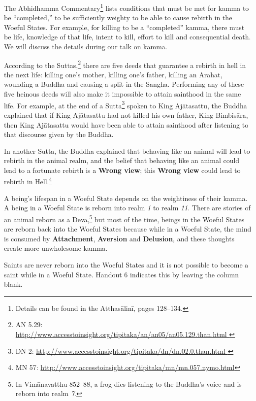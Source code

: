 The Abhidhamma Commentary\footnote{Details can be found in the Atthasālinī, pages 128--134.} lists conditions that must be met for kamma to be “completed,” to be sufficiently weighty to be able to cause rebirth in the Woeful States. For example, for killing to be a “completed” kamma, there must be life, knowledge of that life, intent to kill, effort to kill and consequential death. We will discuss the details during our talk on kamma.

According to the Suttas,\footnote{AN 5.29: \url{http://www.accesstoinsight.org/tipitaka/an/an05/an05.129.than.html }} there are five deeds that guarantee a rebirth in hell in the next life: killing one’s mother, killing one’s father, killing an Arahat, wounding a Buddha and causing a split in the Sangha. Performing any of these five heinous deeds will also make it impossible to attain sainthood in the same life. For example, at the end of a Sutta\footnote{DN 2: \url{http://www.accesstoinsight.org/tipitaka/dn/dn.02.0.than.html }} spoken to King Ajātasattu, the Buddha explained that if King Ajātasattu had not killed his own father, King Bimbisāra, then King Ajātasattu would have been able to attain sainthood after listening to that discourse given by the Buddha.

In another Sutta, the Buddha explained that behaving like an animal will lead to rebirth in the animal realm, and the belief that behaving like an animal could lead to a fortunate rebirth is a \textbf{Wrong view}; this \textbf{Wrong view} could lead to rebirth in Hell.\footnote{MN 57: \url{http://www.accesstoinsight.org/tipitaka/mn/mn.057.nymo.html}}

A being’s lifespan in a Woeful State depends on the weightiness of their kamma. A being in a Woeful State is reborn into realm \textit{1} to realm \textit{11}. There are stories of an animal reborn as a Deva,\footnote{In Vimānavatthu 852--88, a frog dies listening to the Buddha’s voice and is reborn into realm \textit{7}.} but most of the time, beings in the Woeful States are reborn back into the Woeful States because while in a Woeful State, the mind is consumed by \textbf{Attachment}, \textbf{Aversion} and \textbf{Delusion}, and these thoughts create more unwholesome kamma.

Saints are never reborn into the Woeful States and it is not possible to become a saint while in a Woeful State. Handout 6 indicates this by leaving the column blank.

